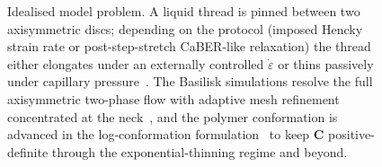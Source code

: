 \documentclass[11pt]{article}
\begin{document}
\begin{figure}[H]
\begin{center}
 \caption{Idealised model problem. A liquid thread is pinned between two axisymmetric discs; depending on the protocol (imposed Hencky strain rate or post-step-stretch CaBER-like relaxation) the thread either elongates under an externally controlled $\dot\varepsilon$ or thins passively under capillary pressure~\citep{mckinleyTripathi2000caber}. The Basilisk simulations resolve the full axisymmetric two-phase flow with adaptive mesh refinement concentrated at the neck~\citep{popinet2015quadtree,basiliskVatsal}, and the polymer conformation is advanced in the log-conformation formulation~\citep{fattalKupferman2004logconf} to keep $\mathbf{C}$ positive-definite through the exponential-thinning regime and beyond.}
 \label{fig:filament-schematic}
\end{center}
\end{figure}
\end{document}
